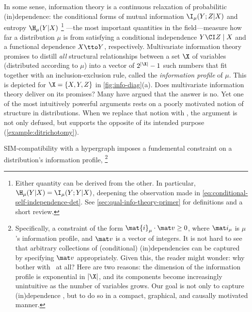 {In some sense, information theory is a continuous relaxation of probabilitic (in)dependence:
the conditional forms of mutual information $\I_\mu(Y;Z|X)$
and entropy $\H_\mu(Y|X)$%
\footnote{%
    Either quantity can be derived from the other. 
    In particular, $\H_\mu(Y|X) = \I_{\mu}(Y;Y|X)$, deepening 
    the observation made in \cref{eq:conditional-self-independence-det}.
    See \cref{sec:qual-info-theory-primer} for definitions and a short review.}%
---the most important quantities in the field---measure
how far a distribution $\mu$ is from satisfying
a conditional independence $Y \CI Z \mid X$ and
a functional dependence $X \tto Y$,
respectively. 
Multivariate information theory promises
to distill \emph{all} {structural} relationships between a set $\X$ of variables (distributed according to $\mu$) into a vector of $2^{|\X|}-1$ such numbers that fit together with an inclusion-exclusion rule, called the \emph{information profile} of $\mu$.
This is depicted for $\X = \{X,Y,Z\}$ in \cref{fig:info-diag}(a).
%
Does multivariate information theory deliver on its promises? 
Many have argued that the answer is no.
Yet one of the most intuitively powerful arguments rests on a poorly motivated notion of structure in distributions.
When we replace that notion with \scibility, the argument is not only defused, but supports the opposite of its intended purpose (\cref{example:ditrichotomy}).

SIM-compatibility with a hypergraph imposes a fundemental constraint on a distribution's information profile,
\unskip\footnote{
    Specifically, a constraint of the form $\mat{i}_\mu \cdot \mat v \ge 0$, where $\mat i_{\mu}$ is $\mu$'s information profile, and $\mat v$ is a vector of integers.
    It is not hard to see that arbitrary collections of (conditional) (in)dependencies can be captured by specifying $\mat v$ appropriately. 
    Given this, the reader might wonder: why bother with \scibility\ at all? Here are two reasons: the dimension of the information profile is exponential in $|\X|$, and its components become increasingly unintuitive as the number of variables grows. Our goal is not only to capture (in)dependence \unskip, but to do so in a compact, graphical, and causally motivated manner. 
    }

}
